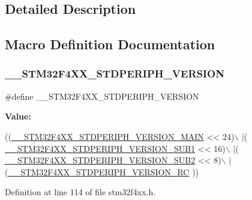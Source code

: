\subsection{Detailed Description}


\subsection{Macro Definition Documentation}
\mbox{\label{group___library__configuration__section_ga2e0157b17c803dbc58b024ec8b2942e1}} 
\subsubsection{\texorpdfstring{\+\_\+\+\_\+\+S\+T\+M32\+F4\+X\+X\+\_\+\+S\+T\+D\+P\+E\+R\+I\+P\+H\+\_\+\+V\+E\+R\+S\+I\+ON}{\_\_STM32F4XX\_STDPERIPH\_VERSION}}
{\footnotesize\ttfamily \#define \+\_\+\+\_\+\+S\+T\+M32\+F4\+X\+X\+\_\+\+S\+T\+D\+P\+E\+R\+I\+P\+H\+\_\+\+V\+E\+R\+S\+I\+ON}

{\bfseries Value\+:}
\begin{DoxyCode}
((\hyperlink{group___library__configuration__section_gab16ffe03509714c63d5e530131c494f4}{\_\_STM32F4XX\_STDPERIPH\_VERSION\_MAIN} << 24)\(\backslash\)
                                             |(
      \hyperlink{group___library__configuration__section_gadce716e810a51b042298fb21b63e5366}{\_\_STM32F4XX\_STDPERIPH\_VERSION\_SUB1} << 16)\(\backslash\)
                                             |(
      \hyperlink{group___library__configuration__section_ga4b16607e43a35289dc5ebb608b1261d4}{\_\_STM32F4XX\_STDPERIPH\_VERSION\_SUB2} << 8)\(\backslash\)
                                             |(\hyperlink{group___library__configuration__section_gad5bec5e54ac96b9238a6363f2088f85c}{\_\_STM32F4XX\_STDPERIPH\_VERSION\_RC}
      ))
\end{DoxyCode}


Definition at line 114 of file stm32f4xx.\+h.

